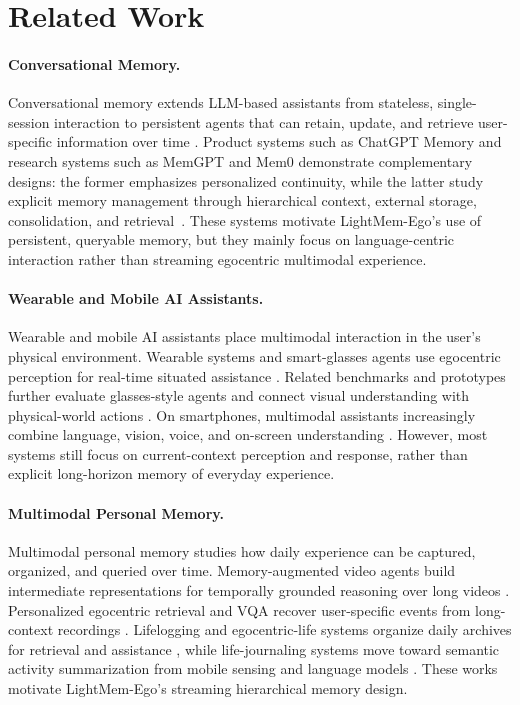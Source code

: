 \section{Related Work}

\paragraph{Conversational Memory.}
Conversational memory extends LLM-based assistants from stateless, single-session interaction to persistent agents that can retain, update, and retrieve user-specific information over time \cite{Memory_for_Autonomous_LLM_Agents, MemOS, LightMem, Mem0}. 
Product systems such as ChatGPT Memory and research systems such as MemGPT and Mem0 demonstrate complementary designs: the former emphasizes personalized continuity, while the latter study explicit memory management through hierarchical context, external storage, consolidation, and retrieval~\cite{GPT-4o, GPT-5, Mem0, MemGPT}. 
These systems motivate LightMem-Ego's use of persistent, queryable memory, but they mainly focus on language-centric interaction rather than streaming egocentric multimodal experience.

\paragraph{Wearable and Mobile AI Assistants.}
Wearable and mobile AI assistants place multimodal interaction in the user's physical environment. 
Wearable systems and smart-glasses agents use egocentric perception for real-time situated assistance \cite{Vinci, Vinci_new, EgoLife, Egocentric_Co-Pilot, Are_we_ready}. 
Related benchmarks and prototypes further evaluate glasses-style agents and connect visual understanding with physical-world actions \cite{SUPERGLASSES, VisualClaw, VisionClaw, ProMemAssist, EgoLife}. 
On smartphones, multimodal assistants increasingly combine language, vision, voice, and on-screen understanding \cite{GPT-4o, Gemini-2.5-pro}. 
However, most systems still focus on current-context perception and response, rather than explicit long-horizon memory of everyday experience.

\paragraph{Multimodal Personal Memory.}
Multimodal personal memory studies how daily experience can be captured, organized, and queried over time. 
Memory-augmented video agents build intermediate representations for temporally grounded reasoning over long videos \cite{VideoAgent, M3-Agent, WorldMM, Ego-R1}. 
Personalized egocentric retrieval and VQA recover user-specific events from long-context recordings \cite{EgoMemory, MyEgo, EgoMemReason, SuperMemory-VQA}. 
Lifelogging and egocentric-life systems organize daily archives for retrieval and assistance \cite{Lifelong_Retrieval, EgoLife}, while life-journaling systems move toward semantic activity summarization from mobile sensing and language models \cite{AutoLife}. 
These works motivate LightMem-Ego's streaming hierarchical memory design.

